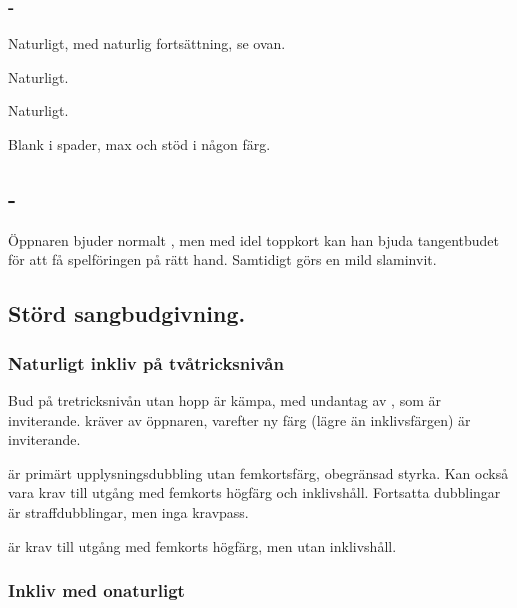 \subsubsection{-}

\bbe
   \item[\NT{3}] Naturligt, med naturlig forts\"attning, se ovan.
   \item[\la{4}] Naturligt.
   \item[\hj{4}] Naturligt.
   \item[\spa{4}] Blank i spader, max och st\"od i n{\aa}gon f\"arg.
\ebe

\subsection{ - }

Öppnaren bjuder normalt , men med idel toppkort kan han bjuda
tangentbudet f\"or att f{\aa} spelf\"oringen p{\aa} r\"att hand. Samtidigt
g\"ors en mild slaminvit.

\subsection{St\"ord sangbudgivning.}

\subsubsection{Naturligt inkliv p{\aa} tv{\aa}tricksniv{\aa}n}

\bbe
\item[Omvänd Lebensohl:] Bud på tretricksnivån utan hopp är kämpa, med
               undantag av , som är inviterande.  kräver 
               av öppnaren, varefter ny färg (lägre än inklivsfärgen) är
               inviterande.  

\item[{\em D}] är primärt upplysningsdubbling utan femkorts\-f\"arg,
               obegränsad styrka. Kan också vara krav till utgång med 
               femkorts högfärg och inklivshåll. Fortsatta dubblingar är
               straffdubblingar, men inga kravpass. 
\item[Överbud] är krav till utgång med femkorts högfärg, men utan
               inklivshåll.  

\ebe

\subsubsection{Inkliv med onaturligt }

